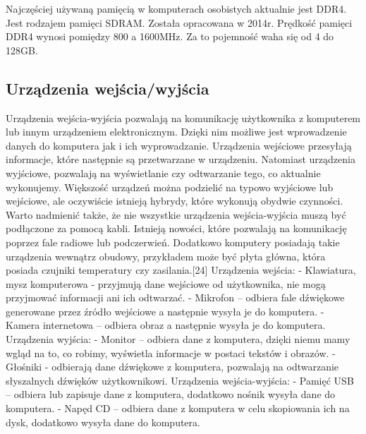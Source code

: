 \documentclass[12pt, a4paper, onside, polish]{article}				%
\begin{document}
Najczęściej używaną pamięcią w komputerach osobistych aktualnie jest DDR4. Jest rodzajem pamięci SDRAM. Została opracowana w 2014r. Prędkość pamięci DDR4 wynosi pomiędzy 800 a 1600MHz. Za to pojemność waha się od 4 do 128GB.  


\subsection{Urządzenia wejścia/wyjścia}
\hspace{\parindent}
Urządzenia wejścia-wyjścia pozwalają na komunikację użytkownika z komputerem lub innym urządzeniem elektronicznym. Dzięki nim możliwe jest wprowadzenie danych do komputera jak i ich wyprowadzanie. Urządzenia wejściowe przesyłają informacje, które następnie są przetwarzane w urządzeniu. Natomiast urządzenia wyjściowe, pozwalają na wyświetlanie czy odtwarzanie tego, co aktualnie wykonujemy. Większość urządzeń można podzielić na typowo wyjściowe lub wejściowe, ale oczywiście istnieją hybrydy, które wykonują obydwie czynności. Warto nadmienić także, że nie wszystkie urządzenia wejścia-wyjścia muszą być podłączone za pomocą kabli. Istnieją nowości, które pozwalają na komunikację poprzez fale radiowe lub podczerwień. Dodatkowo komputery posiadają takie urządzenia wewnątrz obudowy, przykładem może być płyta główna, która posiada czujniki temperatury czy zasilania.[24]  \newline\newline
Urządzenia wejścia: \newline
- Klawiatura, mysz komputerowa - przyjmują dane wejściowe od użytkownika, nie mogą przyjmować informacji ani ich odtwarzać. \newline
- Mikrofon – odbiera fale dźwiękowe generowane przez źródło wejściowe a następnie wysyła je do komputera. \newline
- Kamera internetowa – odbiera obraz a następnie wysyła je do komputera. \newline\newline
 Urządzenia wyjścia: \newline
- Monitor – odbiera dane z komputera, dzięki niemu mamy wgląd na to, co robimy, wyświetla informacje w postaci tekstów i obrazów. \newline
- Głośniki - odbierają dane dźwiękowe z komputera, pozwalają na odtwarzanie słyszalnych dźwięków użytkownikowi. \newline\newline
Urządzenia wejścia-wyjścia: \newline
- Pamięć USB – odbiera lub zapisuje dane z komputera, dodatkowo nośnik wysyła dane do komputera. \newline
- Napęd CD – odbiera dane z komputera w celu skopiowania ich na dysk, dodatkowo wysyła dane do komputera. \newline
\end{document}
